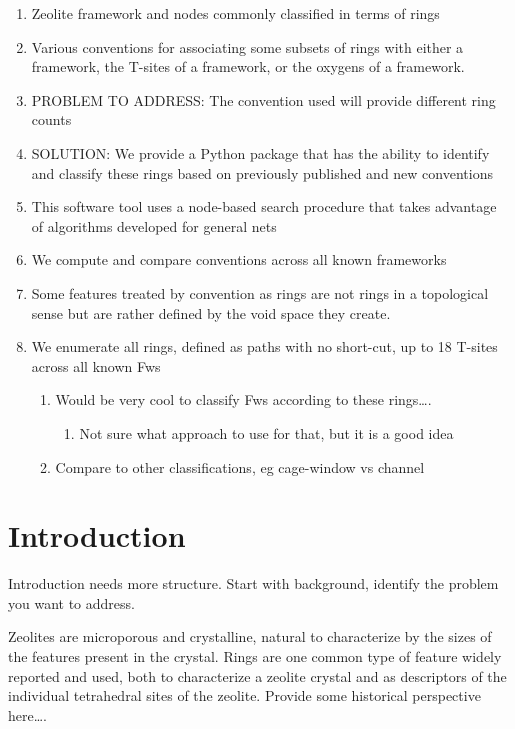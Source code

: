 \documentclass[11pt]{article}
\begin{document}
\begin{enumerate}
\item Zeolite framework and nodes commonly classified in terms of rings
\item Various conventions for associating some subsets of rings with either a framework, the T-sites of a framework, or the oxygens of a framework.
\item PROBLEM TO ADDRESS: The convention used will provide different ring counts
\item SOLUTION: We provide a Python package that has the ability to identify and classify these rings based on previously published and new conventions
\item This software tool uses a node-based search procedure that takes advantage of algorithms developed for general nets
\item We compute and compare conventions across all known frameworks
\item Some features treated by convention as rings are not rings in a topological sense but are rather defined by the void space they create.
\item We enumerate all rings, defined as paths with no short-cut, up to 18 T-sites across all known Fws
\begin{enumerate}
\item Would be very cool to classify Fws according to these rings\ldots{}.
\begin{enumerate}
\item Not sure what approach to use for that, but it is a good idea
\end{enumerate}
\item Compare to other classifications, eg cage-window vs channel
\end{enumerate}
\end{enumerate}

\section*{Introduction}
\label{sec:org6606721}
Introduction needs more structure.  Start with background, identify the problem you want to address.

Zeolites are microporous and crystalline, natural to characterize by the sizes of the features present in the crystal.  Rings are one common type of feature widely reported and used, both to characterize a zeolite crystal and as descriptors of the individual tetrahedral sites of the zeolite.  Provide some historical perspective here\ldots{}.
\end{document}
